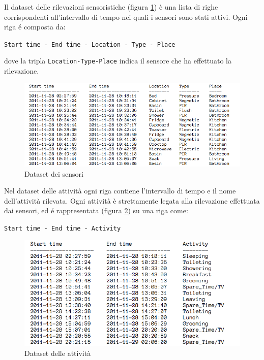 \documentclass[12pt, a4paper]{scrartcl}
\begin{document}
Il dataset delle rilevazioni sensoristiche (figura \ref{fig:dataset-sensori}) è una lista di righe corrispondenti all'intervallo di tempo nei quali i sensori sono stati attivi. Ogni riga é composta da: 
\begin{center}\begin{addmargin}[2em]{2em}
\texttt{Start time - End time - Location - Type - Place}
\end{addmargin}\end{center}
dove la tripla \texttt{Location-Type-Place} indica il sensore che ha effettuato la rilevazione.
\begin{figure}[!ht]
	\centering
	\includegraphics[scale=0.55]{Sensor.png} 
	\caption{Dataset dei sensori}
	\label{fig:dataset-sensori}
\end{figure}

Nel dataset delle attività ogni riga contiene l'intervallo di tempo e il nome dell'attività rilevata. 
Ogni attività è strettamente legata alla rilevazione effettuata dai sensori, ed é rappresentata (figura \ref{fig:dataser-activity}) su una riga come:
\begin{center}\begin{addmargin}[2em]{2em}
\texttt{Start time - End time - Activity}
\end{addmargin}\end{center}
\begin{figure}[!ht]
	\centering
	\includegraphics[scale=0.55]{Activity.png} 
	\caption{Dataset delle attività}
	\label{fig:dataser-activity}
\end{figure}
\end{document}
